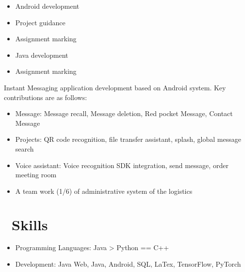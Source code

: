 \documentclass{resume}
\begin{document}
\begin{itemize}
  \item Android development
    \item Project guidance
  \item Assignment marking
\end{itemize}
\begin{itemize}
  \item Java development
    \item Assignment marking
\end{itemize}

 Instant Messaging application development based on Android system. Key contributions are as follows:
\begin{itemize}
  \item Message: Message recall, Message deletion, Red pocket Message, Contact Message
  \item Projects: QR code recognition, file transfer assistant, splash, global message search 
  \item Voice assistant: Voice recognition SDK integration, send message, order meeting room
\end{itemize}



\begin{itemize}
  \item A team work (1/6) of administrative system of the logistics 
\end{itemize}


\section{\faCogs\ Skills}
\begin{itemize}[parsep=0.5ex]
  \item Programming Languages: Java > Python == C++
  \item Development: Java Web, Java, Android, SQL, LaTex, TensorFlow, PyTorch
  
\end{itemize}
\end{document}
